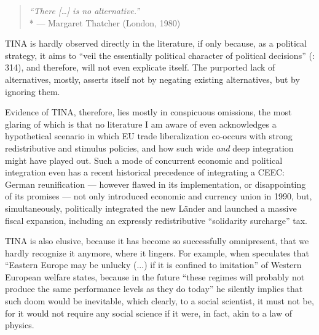 \begin{quote}
	\emph{``There [\ldots] is no alternative.''}\\*
	--- Margaret Thatcher (London, 1980)
\end{quote}

TINA is hardly observed directly in the literature, if only because, as a political strategy, it aims to ``veil the essentially political character of political decisions'' (\citealt{Bluhdorn-2007-aa}: 314), and therefore, will not even explicate itself. The purported lack of alternatives, mostly, asserts itself not by negating existing alternatives, but by ignoring them.  

Evidence of TINA, therefore, lies mostly in conspicuous omissions, the most glaring of which is that no literature I am aware of even acknowledges a hypothetical scenario in which \gls{EU} trade liberalization co-occurs with strong redistributive and stimulus policies, and how such wide \emph{and} deep integration might have played out.   Such a mode of concurrent economic and political integration even has a recent historical precedence of integrating a \gls{CEEC}: German reunification --- however flawed in its implementation, or disappointing of its promises --- not only introduced economic and currency union in 1990, but, simultaneously, politically integrated the new L\"ander and launched a massive fiscal expansion, including an expressly redistributive ``solidarity surcharge'' tax. 

TINA is also elusive, because it has become so successfully omnipresent, that we hardly recognize it anymore, where it lingers. For example, when \citeauthor{Kovasc} speculates that ``Eastern Europe may be unlucky (...) if it is confined to imitation'' of Western European welfare states, because in the future ``these regimes will probably not produce the same performance levels as they do today'' he silently implies that such doom would be inevitable, which clearly, to a social scientist, it must not be, for it would not require any social science if it were, in fact, akin to a law of physics.  

